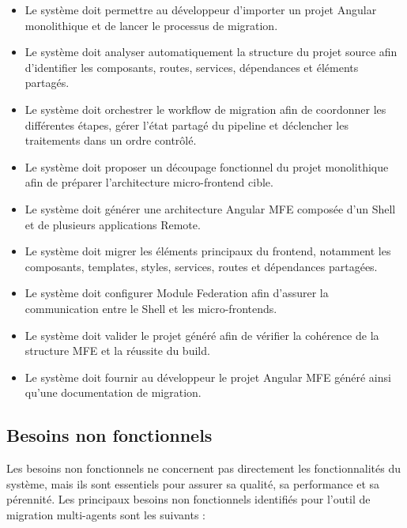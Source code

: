 \begin{itemize}
    \item Le système doit permettre au développeur d'importer un projet Angular monolithique et de lancer le processus de migration.

    \item Le système doit analyser automatiquement la structure du projet source afin d'identifier les composants, routes, services, dépendances et éléments partagés.

    \item Le système doit orchestrer le workflow de migration afin de coordonner les différentes étapes, gérer l'état partagé du pipeline et déclencher les traitements dans un ordre contrôlé.

    \item Le système doit proposer un découpage fonctionnel du projet monolithique afin de préparer l'architecture micro-frontend cible.

    \item Le système doit générer une architecture Angular MFE composée d'un Shell et de plusieurs applications Remote.

    \item Le système doit migrer les éléments principaux du frontend, notamment les composants, templates, styles, services, routes et dépendances partagées.

    \item Le système doit configurer Module Federation afin d'assurer la communication entre le Shell et les micro-frontends.

    \item Le système doit valider le projet généré afin de vérifier la cohérence de la structure MFE et la réussite du build.

    \item Le système doit fournir au développeur le projet Angular MFE généré ainsi qu'une documentation de migration.
\end{itemize}

\subsection{Besoins non fonctionnels}

Les besoins non fonctionnels ne concernent pas directement les fonctionnalités du système,
mais ils sont essentiels pour assurer sa qualité, sa performance et sa pérennité. Les principaux
besoins non fonctionnels identifiés pour l'outil de migration multi-agents sont les suivants :

